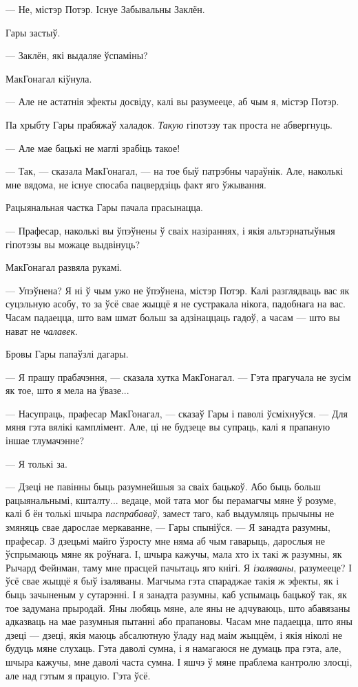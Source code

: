 --- Не, містэр Потэр. Існуе Забывальны Заклён.

Гары застыў.

--- Заклён, які выдаляе ўспаміны?

МакГонагал кіўнула.

--- Але не астатнія эфекты досвіду, калі вы разумееце, аб чым я, містэр Потэр.

Па хрыбту Гары прабяжаў халадок. \emph{Такую} гіпотэзу так проста не абвергнуць.

--- Але мае бацькі не маглі зрабіць такое!

--- Так, --- сказала МакГонагал, --- на тое быў патрэбны чараўнік. Але, наколькі
мне вядома, не існуе спосаба пацвердзіць факт яго ўжывання.

Рацыянальная частка Гары пачала прасынацца.

--- Прафесар, наколькі вы ўпэўнены ў сваіх назіраннях, і якія альтэрнатыўныя 
гіпотэзы вы можаце выдвінуць?

МакГонагал развяла рукамі.

--- Упэўнена? Я ні ў чым ужо не ўпэўнена, містэр Потэр. Калі разглядваць вас як
суцэльную асобу, то за ўсё свае жыццё я не сустракала нікога, падобнага на вас.
Часам падаецца, што вам шмат больш за адзінаццаць гадоў, а часам --- што вы нават не 
\emph{чалавек}.

Бровы Гары папаўзлі дагары.

--- Я прашу прабачэння, --- сказала хутка МакГонагал. --- Гэта прагучала не зусім
як тое, што я мела на ўвазе...

--- Насупраць, прафесар МакГонагал, --- сказаў Гары і паволі ўсміхнуўся. --- Для 
мяня гэта вялікі камплімент. Але, ці не будзеце вы супраць, калі я прапаную 
іншае тлумачэнне?

--- Я толькі за.

--- Дзеці не павінны быць разумнейшыя за сваіх бацькоў. Або быць больш 
рацыянальнымі, кшталту... ведаце, мой тата мог бы перамагчы мяне ў розуме,
калі б ён толькі шчыра \emph{паспрабаваў,} замест таго, каб выдумляць прычыны 
не змяняць свае дарослае меркаванне, --- Гары спыніўся. --- Я занадта разумны, 
прафесар. З дзецьмі майго ўзросту мне няма аб чым
гаварыць, дарослыя не ўспрымаюць мяне як роўнага. І, шчыра кажучы, мала хто іх
такі ж разумны, як Рычард Фейнман, таму мне прасцей пачытаць яго кнігі. 
Я \emph{ізаляваны}, разумееце? І ўсё свае жыццё я быў ізаляваны. Магчыма гэта 
спараджае такія ж эфекты, як і быць зачыненым у сутарэнні.
І я занадта разумны, каб успымаць бацькоў так, як тое задумана прыродай. Яны 
любяць мяне, але яны не адчуваюць, што абавязаны адказваць на мае 
разумныя пытанні або прапановы. Часам мне падаецца, што яны дзеці --- 
дзеці, якія маюць абсалютную ўладу над маім жыццём, і якія ніколі не будуць
мяне слухаць. Гэта даволі сумна, і я намагаюся не думаць пра гэта, але, шчыра
кажучы, мне даволі часта сумна. І яшчэ ў мяне праблема кантролю злосці, але 
над гэтым я працую. Гэта ўсё.

